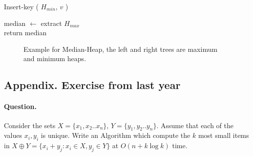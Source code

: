 \begin{algorithm}[H]  
 {
	 {
       Insert-key ( $H_{min}$, $v$ )
    }
}
\end{algorithm}



\begin{algorithm}[H]
median $\leftarrow$ extract $H_{max}$ \\   
return median 
\end{algorithm}


\begin{figure}[h]
  \centering
  \begin{subfigure}[b]{0.49\textwidth}
	
  \end{subfigure}
\begin{subfigure}[b]{0.49\textwidth}
	
  \end{subfigure}
  \caption{ Example for Median-Heap, the left and right trees are maximum and minimum heaps.  }
\end{figure}

\iffalse 
  \newpage

\subsection{ Appendix. Exercise from last year }

\paragraph{Question.} Consider the sets $X = \{x_1,x_2 .. x_n\}$, $Y = \{y_1, y_2 .. y_n\}$. Assume that each of the values $x_i,y_i$ is unique. Write an Algorithm which compute the $k$ most small items in $X \oplus Y = \{ x_{i} + y_{j} : x_{i} \in X , y_{j} \in Y  \} $ at $ O \left( n + k\log k  \right) $ time. 

